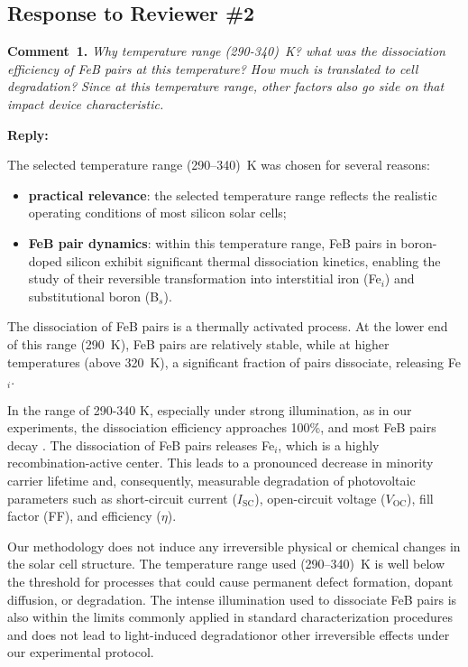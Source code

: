 \documentclass[a4paper,fleqn]{cas-sc}
\begin{document}
\vspace{1cm}
\subsection*{Response to Reviewer \#2 }

\noindent
\textcolor[rgb]{0.00,0.50,1.00}{\textbf{Comment~1.}}
\emph{Why temperature range (290-340)~K? what was the dissociation efficiency of FeB pairs at this temperature? How much is translated to cell degradation? Since at this temperature range, other factors also go side on that impact device characteristic.}


\noindent
\textcolor[rgb]{0.51,0.00,0.00}{\textbf{Reply:}}

The selected temperature range (290–340)~K was chosen for several reasons:
\begin{itemize}
    \item \textbf{practical relevance}: the selected temperature range reflects the realistic operating conditions of most silicon solar cells;
    \item \textbf{FeB pair dynamics}: within this temperature range, FeB pairs in boron-doped silicon exhibit significant thermal dissociation kinetics, enabling the study of their reversible transformation into interstitial iron (Fe$_i$) and substitutional boron (B$_s$).
\end{itemize}

The dissociation of FeB pairs is a thermally activated process. At the lower end of this range (290~K), FeB pairs are relatively stable, while at higher temperatures (above 320~K), a significant fraction of pairs dissociate, releasing Fe$_i$.
\cite{istratov1999}

In the range of 290-340 K, especially under strong illumination, as in our experiments, the dissociation efficiency approaches 100\%, and most FeB pairs decay \cite{istratov1999}. The dissociation of FeB pairs releases Fe$_i$, which is a highly recombination-active center. This leads to a pronounced decrease in minority carrier lifetime and, consequently, measurable degradation of photovoltaic parameters such as short-circuit current ($I_\mathrm{SC}$), open-circuit voltage ($V_\mathrm{OC}$), fill factor (FF), and efficiency ($\eta$).

Our methodology does not induce any irreversible physical or chemical changes in the solar cell structure.
The temperature range used (290–340)~K is well below the threshold for processes that could cause permanent defect formation, dopant diffusion, or degradation.
The intense illumination used to dissociate FeB pairs is also within the limits commonly applied in standard characterization procedures and does not lead to light-induced degradationor other irreversible effects under our experimental protocol.
\end{document}
